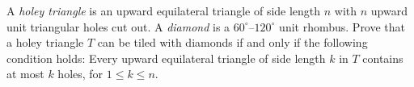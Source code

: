 A \emph{holey triangle} is an upward equilateral triangle of side length $n$ with $n$ upward unit triangular holes cut out. A \emph{diamond} is a $60^{\circ}$--$120^{\circ}$ unit rhombus. Prove that a holey triangle $T$ can be tiled with diamonds if and only if the following condition holds: Every upward equilateral triangle of side length $k$ in $T$ contains at most $k$ holes, for $1 \leq k \leq n$.
